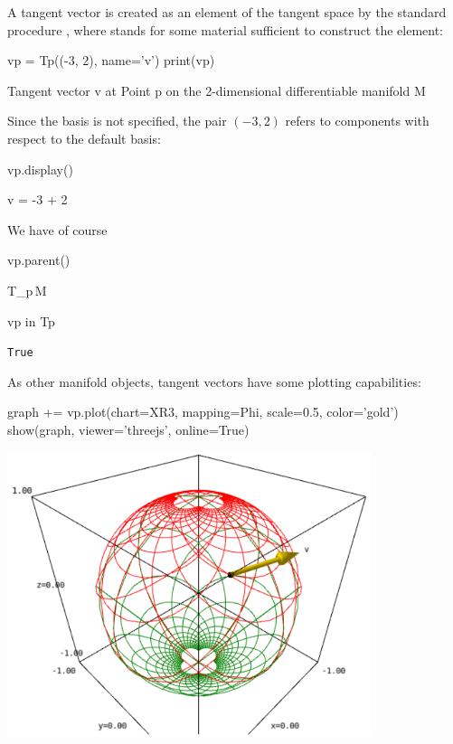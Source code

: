 A tangent vector is created as an element of the tangent space by the
standard \Sage{} procedure
, where 
stands for some material sufficient to construct the element:
\begin{NBin}
vp = Tp((-3, 2), name='v')
print(vp)
\end{NBin}
\begin{NBprint}
Tangent vector v at Point p on the 2-dimensional differentiable manifold M
\end{NBprint}
Since the basis is not specified, the pair $(-3,2)$ refers to components
with respect to the default basis:
\begin{NBin}
vp.display()
\end{NBin}
\begin{NBoutM}
v = -3  + 2 
\end{NBoutM}
We have of course
\begin{NBin}
vp.parent()
\end{NBin}
\begin{NBoutM}
T_{p}\,M
\end{NBoutM}
\begin{NBin}
vp in Tp
\end{NBin}
\begin{NBout}
\texttt{True}
\end{NBout}
As other manifold objects, tangent vectors have some plotting capabilities:
\begin{NBin}
graph += vp.plot(chart=XR3, mapping=Phi, scale=0.5, color='gold')
show(graph, viewer='threejs', online=True)
\end{NBin}
\begin{center}
\includegraphics[width=0.8\textwidth]{sphere_tan_vect.png}
\end{center}

